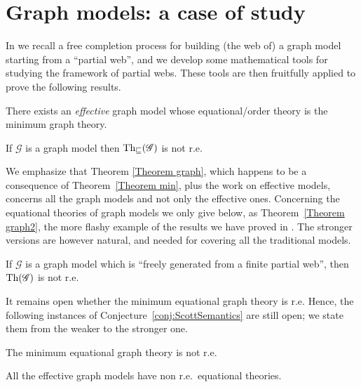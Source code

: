 \documentclass[english]{llncs}
\newcommand{\lm}[1]{\mathscr{#1}} \newcommand{\Lint}[1]{\Lbrack #1\Rbrack} \newcommand{\ca}[1]{\mathscr{#1}} \newcommand{\Int}[1]{\vert #1\vert}
\begin{document}
\section{Graph models: a case of study}\label{sec:Graph models: a case of study}

In \cite[Chapter~5]{ManzonettoTh} we recall a free completion process for building (the web of) a graph model starting from a ``partial web'',
and we develop some mathematical tools for studying the framework of partial webs. 
These tools are then fruitfully applied to prove the following results.

\begin{theorem}\label{Theorem min} \cite[Thm.~6.4.22]{ManzonettoTh}
There exists an \emph{effective} graph model whose equational/order theory is the minimum graph theory.
\end{theorem}

\begin{theorem}\label{Theorem graph} \cite[Thm.~6.4.24]{ManzonettoTh}
If $\lm{G}$ is a graph model then $\Thle{\lm{G}}$ is not r.e.
\end{theorem}

We emphasize that Theorem \ref{Theorem graph}, which happens to be a consequence of Theorem~\ref{Theorem min}, 
plus the work on effective models, concerns all the graph models and not only the effective ones.
Concerning the equational theories of graph models we only give below, as Theorem~\ref{Theorem graph2}, the more flashy example of the results 
we have proved in \cite[Subsection~6.4.3]{ManzonettoTh}. 
The stronger versions are however natural, and needed for covering all the traditional models.


\begin{theorem}\label{Theorem graph2} \cite[Thm.~6.4.11]{ManzonettoTh}
If $\lm{G}$ is a graph model which is ``freely generated from a finite partial web'', then $\Th{\lm{G}}$ is not r.e.
\end{theorem}

It remains open whether the minimum equational graph theory is r.e.
Hence, the following instances of Conjecture~\ref{conj:ScottSemantics}  are still open; we state them from the weaker to the stronger one.



\begin{conjecture}
The minimum equational graph theory is not r.e.
\end{conjecture}

\begin{conjecture}
All the effective graph models have non r.e.\ equational theories.
\end{conjecture}
\end{document}

